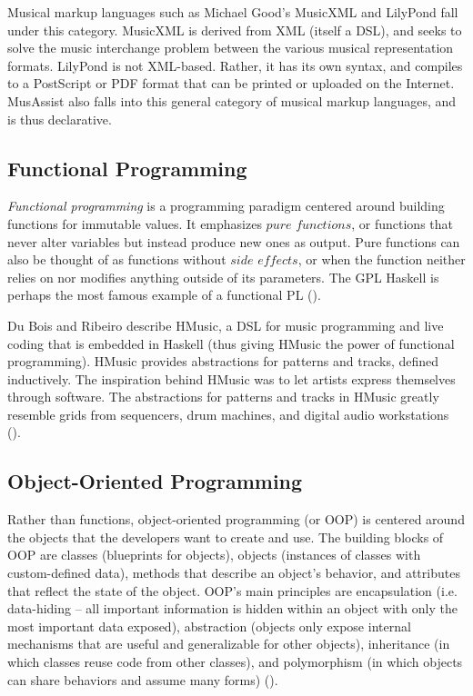 \documentclass{report}
\newcommand\citeparen[1]{(\cite{#1})}
\begin{document}
Musical markup languages such as Michael Good's MusicXML and LilyPond fall under this category. MusicXML is derived from XML (itself a DSL), and seeks to solve the music interchange problem between the various musical representation formats.  \cite{good_2013} LilyPond is not XML-based. Rather, it has its own syntax, and compiles to a PostScript or PDF format that can be printed or uploaded on the Internet. MusAssist also falls into this general category of musical markup languages, and is thus declarative.

\subsection{Functional Programming}
\label{sec:functional}
\textit{Functional programming} is a programming paradigm centered around  building functions for immutable values. It emphasizes $pure$ $functions$, or functions that never alter variables  but instead produce new  ones as output. Pure functions  can also be thought of as functions without $side$ $effects$, or when the function neither relies on nor modifies anything outside of its parameters. The GPL Haskell is perhaps the most famous example of a functional PL \citeparen{joury_2020}.

Du Bois and Ribeiro describe HMusic, a DSL for music programming and live coding that is embedded in Haskell (thus giving HMusic the power  of functional programming). HMusic provides abstractions for patterns and tracks, defined inductively. The inspiration behind HMusic was to let artists express  themselves through software. The abstractions for patterns and  tracks in HMusic greatly resemble grids from sequencers, drum  machines, and digital audio workstations \citeparen{bois_ribeiro_1970}.

\subsection{Object-Oriented Programming}
\label{sec:object_oriented}
Rather  than functions, object-oriented programming (or OOP) is centered around the objects that the developers want to create and  use. The  building blocks  of OOP  are  classes (blueprints for  objects),  objects (instances  of classes with custom-defined data),  methods that describe an object's behavior,  and  attributes that reflect the state of the  object. OOP's main  principles are encapsulation  (i.e. data-hiding -- all important information  is  hidden within  an  object with  only the  most  important data  exposed),  abstraction  (objects only  expose internal mechanisms  that are  useful and  generalizable for other  objects), inheritance (in which classes reuse  code  from other classes),  and polymorphism (in which objects  can  share behaviors and assume many forms) \citeparen{gillis_lewis_2021}.
\end{document}
